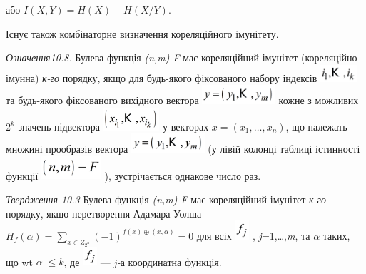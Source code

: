 {\centering
або   $I(X,Y)=H(X)-H(X/Y)$.
\par}

Існує також комбінаторне визначення кореляційного імунітету.

\textit{Означення10.8.}\textit{ }Булева функція
\textit{(}\textit{n}\textit{,}\textit{m}\textit{)-}\textit{F}  має кореляційний
імунітет (кореляційно імунна) \textit{к-го }порядку, якщо для будь-якого
фіксованого набору індексів 
\includegraphics[width=0.528in,height=0.25in]{crypt-img/crypt-img216.png}  та
будь-якого фіксованого вихідного вектора 
\includegraphics[width=1.0693in,height=0.278in]{crypt-img/crypt-img217.png} 
кожне з можливих  $2^k$ значень підвектора 
\includegraphics[width=0.8193in,height=0.3335in]{crypt-img/crypt-img218.png}  у
векторах  $x=(x_{1},\dots,x_n)$, що належать множині
прообразів вектора 
\includegraphics[width=1.0693in,height=0.278in]{crypt-img/crypt-img219.png}  
(у лівій колонці таблиці істинності функції 
\includegraphics[width=0.8744in,height=0.3425in]{crypt-img/crypt-img220.png} ),
зустрічається однакове число раз.

\textit{Твердження 10.3}\textit{ }Булева функція
\textit{(}\textit{n}\textit{,}\textit{m}\textit{)-}\textit{F}  має кореляційний
імунітет \textit{к-го }порядку, якщо перетворення Адамара-Уолша 
${H_{f}(\alpha )=\underset{x\in Z_{{2}^{n}}}{\sum
}{(-1)^{f(x){\oplus}(x,\alpha )}}=0}$ для всіх 
\includegraphics[width=0.2083in,height=0.278in]{crypt-img/crypt-img221.png} ,
\textit{j}=1,…,\textit{m}, та   $\alpha $\textit{ }\textit{ }таких, що wt
$\alpha \;\le k$, де 
\includegraphics[width=0.2083in,height=0.278in]{crypt-img/crypt-img222.png}  ---
\textit{j-}а \textit{ }координатна функція.

